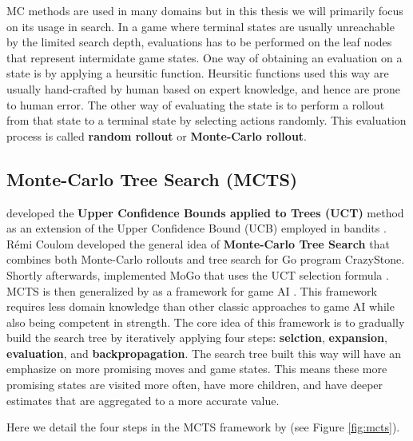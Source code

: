 \documentclass[12pt]{article}
\begin{document}
MC methods are used in many domains but in this thesis we will primarily focus on its usage in search.
In a game where terminal states are usually unreachable by the limited search depth, evaluations has to be performed on the leaf nodes that represent intermidate game states.
One way of obtaining an evaluation on a state is by applying a heursitic function.
Heursitic functions used this way are usually hand-crafted by human based on expert knowledge, and hence are prone to human error.
The other way of evaluating the state is to perform a rollout from that state to a terminal state by selecting actions randomly.
This evaluation process is called \textbf{random rollout} or \textbf{Monte-Carlo rollout}.

\subsection{Monte-Carlo Tree Search (MCTS)} \label{sec:MCTS}

\citeauthor{BanditBasedMonteCarlo_Kocsis.Szepesvari_2006} developed the \textbf{Upper Confidence Bounds applied to Trees (UCT)} method as an extension of the Upper Confidence Bound (UCB) employed in bandits \cite{BanditBasedMonteCarlo_Kocsis.Szepesvari_2006}.
Rémi Coulom developed the general idea of \textbf{Monte-Carlo Tree Search} that combines both Monte-Carlo rollouts and tree search \cite{EfficientSelectivityBackup_Coulom_2007} for Go program CrazyStone.
Shortly afterwards,
\citeauthor{ModificationUCTPatterns_Gelly.Wang.ea_2006} implemented MoGo that uses the UCT selection formula \cite{ModificationUCTPatterns_Gelly.Wang.ea_2006}.
MCTS is then generalized by \citeauthor{MonteCarloTreeSearch_Chaslot.Bakkes.ea_2008} as a framework for game AI \cite{MonteCarloTreeSearch_Chaslot.Bakkes.ea_2008}.
This framework requires less domain knowledge than other classic approaches to game AI while also being competent in strength.
The core idea of this framework is to gradually build the search tree by iteratively applying four steps: \textbf{selction}, \textbf{expansion}, \textbf{evaluation}, and \textbf{backpropagation}.
The search tree built this way will have an emphasize on more promising moves and game states.
This means these more promising states are visited more often, have more children, and have deeper estimates that are aggregated to a more accurate value.

Here we detail the four steps in the MCTS framework by \citeauthor{MonteCarloTreeSearch_Chaslot.Bakkes.ea_2008} (see Figure \ref{fig:mcts}).
\end{document}
